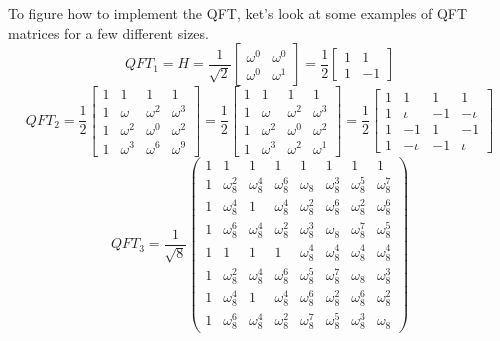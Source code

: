 To figure how to implement the QFT, ket's look at some examples of QFT matrices for a few different sizes.
\begin{equation}
    QFT_1=H=\frac{1}{\sqrt{2}}\begin{bmatrix}\omega^0 & \omega^0\\
    \omega^0 & \omega^1 \end{bmatrix}=\frac{1}{2} \begin{bmatrix}
        1 & 1 \\
        1 & -1
    \end{bmatrix}
\end{equation}
\begin{equation}
    QFT_2 = \frac{1}{2}\begin{bmatrix}
        1 & 1 & 1 & 1 \\
        1 & \omega & \omega^2 & \omega^3\\
        1 & \omega^2 & \omega^0 & \omega^2 \\
        1 & \omega^3 & \omega^6 & \omega^9
    \end{bmatrix}=
        \frac{1}{2} \begin{bmatrix}
            1 &1 & 1 & 1\\
            1 & \omega & \omega^2 & \omega^3\\
            1 & \omega^2 & \omega^0 & \omega^2\\
            1 & \omega^3 & \omega^2 & \omega^1
        \end{bmatrix}=\frac{1}{2}\begin{bmatrix}
            1 & 1 & 1 & 1\\
            1 & \iota & -1 & -\iota \\
            1 & -1 & 1 & -1 \\
            1 & -\iota & -1 & \iota 
        \end{bmatrix}
\end{equation}
\begin{equation}
    QFT_3= \frac{1}{\sqrt{8}} \begin{pmatrix}
1 & 1 & 1 & 1 & 1 & 1 & 1 & 1 \\
1 & \omega_8^2 & \omega_8^4 & \omega_8^6 & \omega_8 & \omega_8^3 & \omega_8^5 & \omega_8^7 \\
1 & \omega_8^4 & 1 & \omega_8^4 & \omega_8^2 & \omega_8^6 & \omega_8^2 & \omega_8^6 \\
1 & \omega_8^6 & \omega_8^4 & \omega_8^2 & \omega_8^3 & \omega_8 & \omega_8^7 & \omega_8^5 \\
1 & 1 & 1 & 1 & \omega_8^4 & \omega_8^4 & \omega_8^4 & \omega_8^4 \\
1 & \omega_8^2 & \omega_8^4 & \omega_8^6 & \omega_8^5 & \omega_8^7 & \omega_8 & \omega_8^3 \\
1 & \omega_8^4 & 1 & \omega_8^4 & \omega_8^6 & \omega_8^2 & \omega_8^6 & \omega_8^2 \\
1 & \omega_8^6 & \omega_8^4 & \omega_8^2 & \omega_8^7 & \omega_8^5 & \omega_8^3 & \omega_8
\end{pmatrix}
\end{equation}
